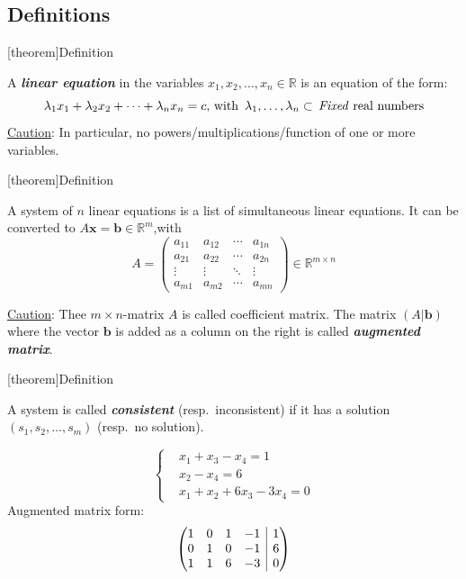 \documentclass[12pt]{report}
\theoremstyle{definition}
\begin{document}
\subsection{Definitions}

[theorem]{Definition}
\begin{linear equation}
    A \textbf{\emph{linear equation}} in the variables $x_1, x_2, \ldots, x_n \in \mathbb{R}$
    is an equation of the form:\[
        \lambda_1 x_1 + \lambda_2 x_2 + \cdots + \lambda_n x_n = c, 
        \,\textnormal{with }\, \lambda_1,\ldots,\lambda_n \subset \,\textnormal{\emph{Fixed} real numbers}
    \]
    \underline{Caution}: In particular, no powers/multiplications/function of one or more variables.
\end{linear equation}

[theorem]{Definition}
\begin{simultaneous list of linear equations}
    A system of $n$ linear equations is a list of simultaneous linear equations.
    It can be converted to $A\mathbf{x} = \mathbf{b} \in \mathbb{R}^{m}$,with\[
        A = \begin{pmatrix}
            a_{11} & a_{12} & \cdots & a_{1n} \\
            a_{21} & a_{22} & \cdots & a_{2n} \\
            \vdots & \vdots & \ddots & \vdots \\
            a_{m1} & a_{m2} & \cdots & a_{mn}
        \end{pmatrix} 
        \in \mathbb{R}^{m \times n}
    \]
\end{simultaneous list of linear equations}
\underline{Caution}: Thee $m \times n$-matrix $A$ is called coefficient matrix.
The matrix $(A|\mathbf{b})$ where the vector $\mathbf{b}$ is added as a column on the  right
is called \textbf{\emph{augmented matrix}}.

[theorem]{Definition}
\begin{consistent system}
    A system is called \textbf{\emph{consistent}} (resp.\ inconsistent)
    if it has a solution $(s_1, s_2, \ldots, s_m)$ (resp.\ no solution).
\end{consistent system}

\begin{ex}
    \[\left\{
        \begin{align*}
            & x_1 + x_3 - x_4 = 1 \\
            & x_2 - x_4 = 6 \\
            & x_1 + x_2 + 6x_3 - 3x_4 = 0
        \end{align*}
     \right.   
    \]
    Augmented matrix form:\[
        \left(\begin{array}{@{}cccc|c@{}}%
                1 & 0 & 1 & -1 & 1 \\
                0 & 1 & 0 & -1 & 6 \\
                1 & 1 & 6 & -3 & 0
        \end{array}\right)
    \]
\end{ex}
\end{document}
